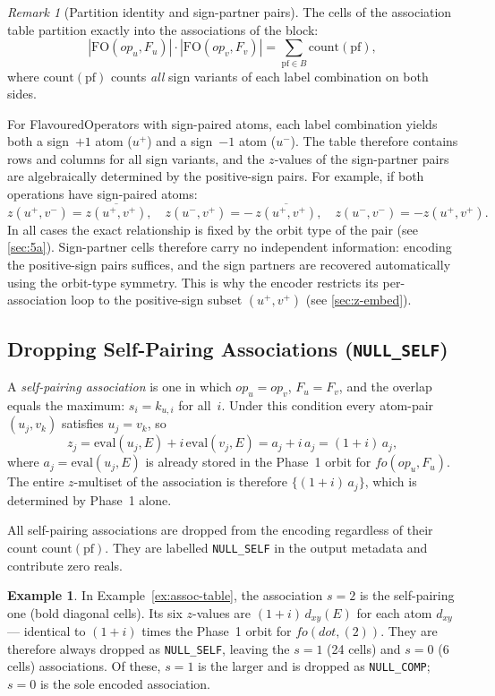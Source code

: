 \documentclass[11pt,a4paper]{article}
\theoremstyle{definition}
\newtheorem{example}[definition]{Example}
\theoremstyle{plain}
\theoremstyle{remark}
\newtheorem{remark}[definition]{Remark}
\newcommand{\eval}{\mathrm{eval}}
\newcommand{\fo}{\mathrm{FO}}
\newcommand{\pf}{\mathrm{pf}}
\newcommand{\acount}{\mathrm{count}}
\begin{document}
\begin{remark}[Partition identity and sign-partner pairs]
\label{rem:sign-partners}
The cells of the association table partition exactly into the associations of
the block:
\[
  |\fo(\mathit{op}_u,F_u)| \cdot |\fo(\mathit{op}_v,F_v)|
  = \sum_{\pf \in B} \acount(\pf),
\]
where $\acount(\pf)$ counts \emph{all} sign variants of each label combination
on both sides.

For FlavouredOperators with sign-paired atoms, each label combination yields
both a sign~$+1$ atom ($u^+$) and a sign~$-1$ atom ($u^-$).  The table
therefore contains rows and columns for all sign variants, and the $z$-values
of the sign-partner pairs are algebraically determined by the positive-sign
pairs.  For example, if both operations have sign-paired atoms:
\[
  z(u^+,v^-) = \overline{z(u^+,v^+)}, \quad
  z(u^-,v^+) = -\,\overline{z(u^+,v^+)}, \quad
  z(u^-,v^-) = -z(u^+,v^+).
\]
In all cases the exact relationship is fixed by the orbit type of the pair
(see \cref{sec:5a}).  Sign-partner cells therefore carry no independent
information: encoding the positive-sign pairs suffices, and the sign partners
are recovered automatically using the orbit-type symmetry.  This is why the
encoder restricts its per-association loop to the positive-sign subset
$(u^+, v^+)$ (see \cref{sec:z-embed}).
\end{remark}

\subsection{Dropping Self-Pairing Associations (\texttt{NULL\_SELF})}
\label{sec:null-self}

A \emph{self-pairing association} is one in which $\mathit{op}_u = \mathit{op}_v$,
$F_u = F_v$, and the overlap equals the maximum: $s_i = k_{u,i}$ for all~$i$.
Under this condition every atom-pair $(u_j, v_k)$ satisfies $u_j = v_k$, so
\[
  z_j = \eval(u_j, E) + i\,\eval(v_j, E) = a_j + i\,a_j = (1+i)\,a_j,
\]
where $a_j = \eval(u_j, E)$ is already stored in the Phase~1 orbit for
$\mathit{fo}(\mathit{op}_u, F_u)$.  The entire $z$-multiset of the association
is therefore $\{(1+i)\,a_j\}$, which is determined by Phase~1 alone.

All self-pairing associations are dropped from the encoding regardless of their
count $\acount(\pf)$.  They are labelled \texttt{NULL\_SELF} in the output
metadata and contribute zero reals.

\begin{example}
In Example~\ref{ex:assoc-table}, the association $s=2$ is the self-pairing one
(bold diagonal cells).  Its six $z$-values are $(1+i)\,d_{xy}(E)$ for each
atom $d_{xy}$ — identical to $(1+i)$ times the Phase~1 orbit for
$\mathit{fo}(\mathit{dot},(2))$.  They are therefore always dropped as
\texttt{NULL\_SELF}, leaving the $s=1$ (24 cells) and $s=0$ (6 cells)
associations.  Of these, $s=1$ is the larger and is dropped as
\texttt{NULL\_COMP}; $s=0$ is the sole encoded association.
\end{example}
\end{document}
